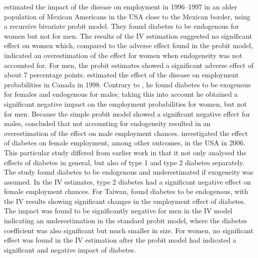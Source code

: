 \textcite{Brown2005} estimated the impact of the disease on
employment in 1996--1997 in an older population of Mexican Americans
in the USA close to the Mexican border, using a recursive bivariate
probit model. They found diabetes to be endogenous for women but not
for men. The results of the \ac{IV} estimation suggested no significant
effect on women which, compared to the adverse effect found in the
probit model, indicated an overestimation of the effect for women
when endogeneity was not accounted for. For men, the probit estimates
showed a significant adverse effect of about 7 percentage points.
\textcite{Latif2009} estimated the effect of the disease on employment
probabilities in Canada in 1998. Contrary to \textcite{Brown2005}, he
found diabetes to be exogenous for females and endogenous for males;
taking this into account he obtained a significant negative impact
on the employment probabilities for women, but not for men. Because
the simple probit model showed a significant negative effect for males,
\textcite{Latif2009} concluded that not accounting for endogeneity resulted
in an overestimation of the effect on male employment chances. \textcite{Minor2010a}
investigated the effect of diabetes on female employment, among other
outcomes, in the USA in 2006. This particular study differed
from earlier work in that it not only analysed the effects of diabetes
in general, but also of type 1 and type 2 diabetes separately. The
study found diabetes to be endogenous and underestimated if exogeneity
was assumed. In the \ac{IV} estimates, type 2 diabetes had a significant
negative effect on female employment chances. For Taiwan, \textcite{Lin2011b}
found diabetes to be endogenous, with the \ac{IV} results showing
significant changes in the employment effect of diabetes. The impact
was found to be significantly negative for men in the \ac{IV} model
indicating an underestimation in the standard probit model, where
the diabetes coefficient was also significant but much smaller in
size. For women, no significant effect was found in the \ac{IV} estimation
after the probit model had indicated a significant and negative impact
of diabetes. 

